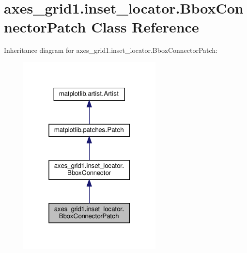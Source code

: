 \hypertarget{classaxes__grid1_1_1inset__locator_1_1BboxConnectorPatch}{}\section{axes\+\_\+grid1.\+inset\+\_\+locator.\+Bbox\+Connector\+Patch Class Reference}
\label{classaxes__grid1_1_1inset__locator_1_1BboxConnectorPatch}


Inheritance diagram for axes\+\_\+grid1.\+inset\+\_\+locator.\+Bbox\+Connector\+Patch\+:
\nopagebreak
\begin{figure}[H]
\begin{center}
\leavevmode
\includegraphics[width=205pt]{classaxes__grid1_1_1inset__locator_1_1BboxConnectorPatch__inherit__graph}
\end{center}
\end{figure}


